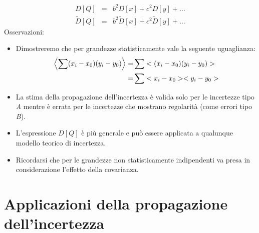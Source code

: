 \documentclass[11pt,a4paper]{book}
\begin{document}
\begin{itemize}
\begin{eqnarray}
D[Q] &=& b^2D[x]+c^2D[y]+ \dots \label{eq_2.23}\\ 
\tilde{D}[Q] &=& b^2 \tilde{D}[x]+c^2 \tilde{D}[y]+ \dots \label{eq_2.24}
\end{eqnarray}
Osservazioni:
\begin{itemize}
\item Dimostreremo che per grandezze statisticamente vale la seguente uguaglianza:
\begin{align}
\left\langle \sum(x_i-x_0)(y_i-y_0)\right\rangle  =&  \sum<(x_i-x_0)(y_i-y_0)>\\ =& \sum <x_i-x_0><y_i-y_0> \notag
\end{align}
\item La stima della propagazione dell'incertezza è valida solo per le incertezze tipo \textit{A} mentre è errata per le incertezze che mostrano regolarità (come errori tipo \textit{B}).
\item L'espressione $ D[Q] $ è più generale e può essere applicata a qualunque modello teorico di incertezza.
\item Ricordarsi che per le grandezze non statisticamente indipendenti va presa in considerazione l'effetto della covarianza.
\end{itemize}
\end{itemize}
\section{Applicazioni della propagazione dell'incertezza}
\end{document}
